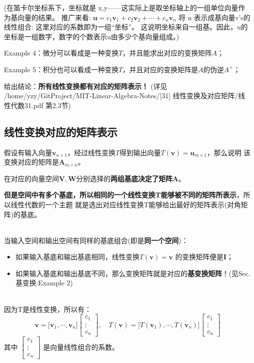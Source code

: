 (在笛卡尔坐标系下，坐标就是 x,y——这实际上是取坐标轴上的一组单位向量作为基向量的结果。
推广来看:
$\bm{u}=c_{1} \bm{v}_{1}+c_{2} \bm{v}_{2}+\cdots+c_{n} \bm{v}_{n}$
将 u 表示成基向量v's的线性组合: 这里对应的系数即为一组“坐标”。
这说明坐标来自一组基。因此，u的坐标是一组数字，数字的个数表示u由多少个基向量组成。)

Example 4：微分可以看成是一种变换$T$，并且能求出对应的变换矩阵$A$；

Example 5：积分也可以看成一种变换$T$，并且对应的变换矩阵是$A$的伪逆$A^{+}$；

给出结论：\textbf{所有线性变换都有对应的矩阵表示！}
(详见 /home/yzy/GitProject/MIT-Linear-Algebra-Notes/[31] 线性变换及对应矩阵/线性代数31.pdf 第2.3节)

\subsection{线性变换对应的矩阵表示}
假设有输入向量$\bm{v}_{n\times 1}$，经过线性变换$T$得到输出向量$T(\bm{v})= \bm{u}_{m\times 1}$，那么说明
该变换对应的矩阵是$\bm{A}_{m\times n}$。

在对应的向量空间$\bm{V,W}$分别选择的\textbf{两组基底决定了矩阵}$\bm{A}$。

\textbf{但是空间中有多个基底，所以相同的一个线性变换T能够被不同的矩阵所表示}，所以线性代数的一个主题
就是选出对应线性变换T能够给出最好的矩阵表示(对角矩阵)的基底。

\hspace*{\fill} \\
当输入空间和输出空间有同样的基底组合(即是\textbf{同一个空间})：
\begin{itemize}
    \item 如果输入基底和输出基底相同，线性变换$T(\boldsymbol{v})=\boldsymbol{v}$
    的变换矩阵便是$\boldsymbol{I}$；
    \item 如果输入基底和输出基底不同，那么变换矩阵就是对应的\textbf{基变换矩阵}！(见Sec.基变换:Example 2)
\end{itemize}

\hspace*{\fill} \\
因为T是线性变换，所以有：
$$
\boldsymbol{v}=\Biggl[\boldsymbol{v}_1, \cdots, \boldsymbol{v}_n\Biggr]
\begin{bmatrix}
    c_1 \\ \vdots \\ c_n
\end{bmatrix}
,\quad
T(\boldsymbol{v})=\Biggl[T(\boldsymbol{v}_1), \cdots, T(\boldsymbol{v}_n)\Biggr]
\begin{bmatrix}
    c_1 \\ \vdots \\ c_n
\end{bmatrix}
$$
其中
$
\begin{bmatrix}
    c_1 \\ \vdots \\ c_n
\end{bmatrix}
$
是向量线性组合的系数。

